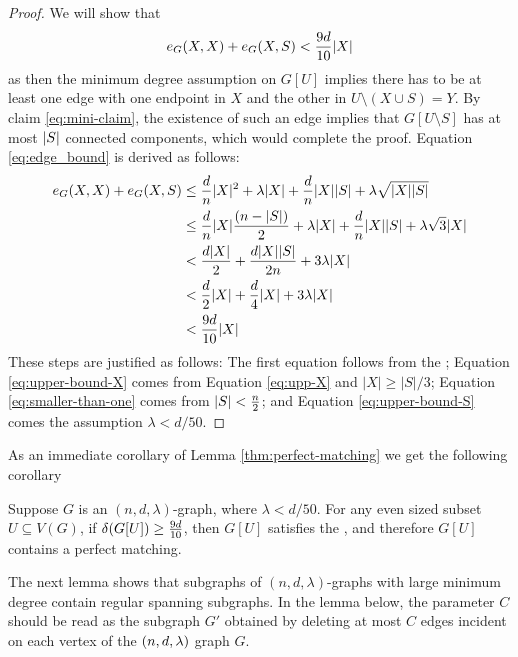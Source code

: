 \documentclass[11pt]{article}
\begin{document}
\begin{proof}
  We will show that
    \begin{equation} \label{eq:edge_bound}
        \CutEdges{X}{X}{G} + \CutEdges{X}{S}{G} < \cTilde|X|
    \end{equation}
    as then the minimum degree assumption on $G[U]$ implies there has to be at least one edge with one endpoint in $X$ and the other in $U \setminus (X \cup S) = Y$. By claim \eqref{eq:mini-claim}, the existence of such an edge implies that $G[U\setminus S]$ has at most $\Size{S}$ connected components, which would complete the proof.
    Equation \eqref{eq:edge_bound} is derived as follows: 
\begin{align}
  \CutEdges{X}{X}{G} + \CutEdges{X}{S}{G} &\le \frac{d}{n}|X|^2 + \lambda |X| + \frac{d}{n}|X||S| + \lambda\sqrt{|X||S|}        \\
&\le \frac{d}{n} |X| \frac{(n-|S|)}{2} + \lambda |X| + \frac{d}{n}|X||S| + \lambda\sqrt{3} |X| \label{eq:upper-bound-X}  \\
&< \frac{d|X|}{2} + \frac{d|X||S|}{2n} + 3 \lambda |X|\\
&< \frac{d}{2}|X| + \frac{d}{4}|X| + 3 \lambda |X| \label{eq:smaller-than-one} \\
&< \cTilde|X|  \label{eq:upper-bound-S}
\end{align}
These steps are justified as follows: The first equation follows from the ; Equation \eqref{eq:upper-bound-X} comes from Equation \eqref{eq:upp-X} and $|X| \ge |S|/3$;
Equation \eqref{eq:smaller-than-one} comes from $\Size{S} < \frac{n}{2}$; and  Equation \eqref{eq:upper-bound-S} comes the assumption $\lambda < d/50$.
\end{proof}

As an immediate corollary of Lemma \ref{thm:perfect-matching} we get the following corollary
\begin{corollary}\label{cor:perfect-matching}
Suppose $G$ is an $(n, d, \lambda)$-graph, where $\lambda < d/50$. 
For any even sized subset $U \subseteq V(G)$, if $\delta(G[U]) \ge \cTilde$, then $G[U]$ satisfies the , and therefore $G[U]$ contains a perfect matching.  
\end{corollary}

The next lemma shows that subgraphs of $(n, d, \lambda)$-graphs with large minimum degree contain regular spanning subgraphs.
In the lemma below, the parameter $C$ should be read as the subgraph $G'$ obtained by deleting at most $C$ edges incident on each vertex of the $\EnDeeLambda$ graph $G$.
\end{document}
